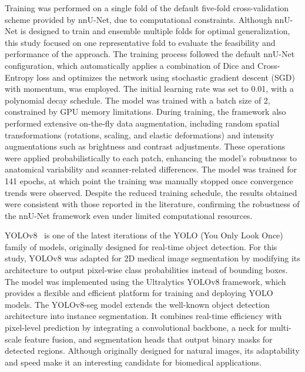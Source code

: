 \documentclass[12pt]{article}
\begin{document}
Training was performed on a single fold of the default five-fold cross-validation scheme provided by nnU-Net, due to computational constraints. Although nnU-Net is designed to train and ensemble multiple folds for optimal generalization, this study focused on one representative fold to evaluate the feasibility and performance of the approach.
%
The training process followed the default nnU-Net configuration, which automatically applies a combination of Dice and Cross-Entropy loss and optimizes the network using stochastic gradient descent (SGD) with momentum, was employed. The initial learning rate was set to 0.01, with a polynomial decay schedule. The model was trained with a batch size of 2, constrained by GPU memory limitations.
%
During training, the framework also performed extensive on-the-fly data augmentation, including random spatial transformations (rotations, scaling, and elastic deformations) and intensity augmentations such as brightness and contrast adjustments. These operations were applied probabilistically to each patch, enhancing the model’s robustness to anatomical variability and scanner-related differences.
%
The model was trained for 141 epochs, at which point the training was manually stopped once convergence trends were observed. Despite the reduced training schedule, the results obtained were consistent with those reported in the literature, confirming the robustness of the nnU-Net framework even under limited computational resources.


YOLOv8~\cite{jocherUltralyticsYolov5V702022} is one of the latest iterations of the YOLO (You Only Look Once) family of models, originally designed for real-time object detection. For this study, YOLOv8 was adapted for 2D medical image segmentation by modifying its architecture to output pixel-wise class probabilities instead of bounding boxes. The model was implemented using the Ultralytics YOLOv8 framework, which provides a flexible and efficient platform for training and deploying YOLO models.
%
The YOLOv8-seg model extends the well-known object detection architecture into instance segmentation. It combines real-time efficiency with pixel-level prediction by integrating a convolutional backbone, a neck for multi-scale feature fusion, and segmentation heads that output binary masks for detected regions. Although originally designed for natural images, its adaptability and speed make it an interesting candidate for biomedical applications. 
\end{document}
